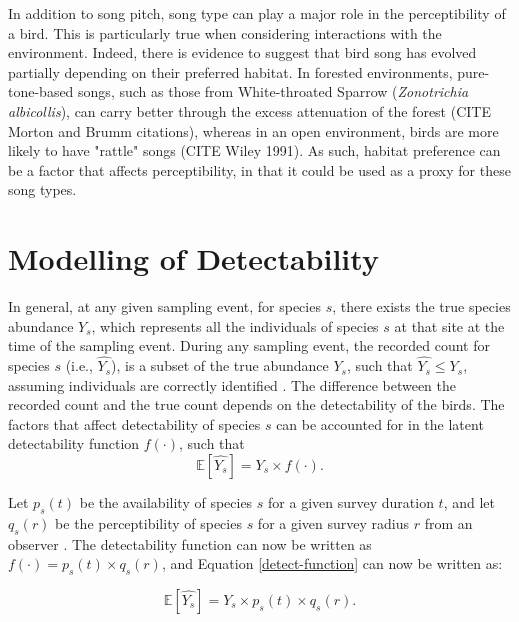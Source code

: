\par In addition to song pitch, song type can play a major role in the perceptibility of a bird.
This is particularly true when considering interactions with the environment.
Indeed, there is evidence to suggest that bird song has evolved partially depending on their preferred habitat.
In forested environments, pure-tone-based songs, such as those from White-throated Sparrow (\textit{Zonotrichia albicollis}), can carry better through the excess attenuation of the forest (CITE Morton and Brumm citations), whereas in an open environment, birds are more likely to have "rattle" songs (CITE Wiley 1991).
As such, habitat preference can be a factor that affects perceptibility, in that it could be used as a proxy for these song types.

\section{Modelling of Detectability}

\par In general, at any given sampling event, for species $s$, there exists the true species abundance $Y_s$, which represents all the individuals of species $s$ at that site at the time of the sampling event. During any sampling event, the recorded count for species $s$ (i.e., $\hat{Y_s}$), is a subset of the true abundance $Y_s$, such that $\hat{Y_s} \leq Y_s$, assuming individuals are correctly identified \citep{bennett_how_2024, johnson_defense_2008}. The difference between the recorded count and the true count depends on the detectability of the birds. The factors that affect detectability of species $s$ can be accounted for in the latent detectability function $f(\cdot)$, such that
\begin{equation}\label{detect-function}
	\mathbb{E}\left[\hat{Y_s}\right] = Y_s \times f(\cdot).
\end{equation}

\par Let $p_s(t)$ be the availability of species $s$ for a given survey duration $t$, and let $q_s(r)$ be the perceptibility of species $s$ for a given survey radius $r$ from an observer \citep{solymos_calibrating_2013}. The detectability function can now be written as $f(\cdot) = p_s(t) \times q_s(r)$, and Equation \ref{detect-function} can now be written as:

\begin{equation*}
	\mathbb{E}\left[\hat{Y_s}\right] = Y_s \times p_s(t) \times q_s(r).
\end{equation*}

